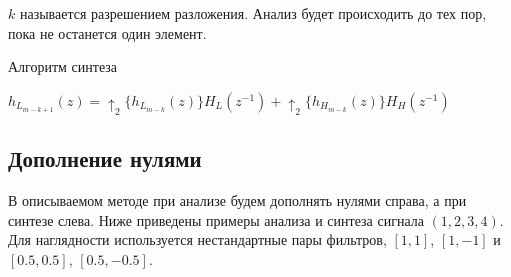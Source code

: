 \documentclass[oneside, final, 14pt]{article}
\begin{document}
$k$ называется разрешением разложения. Анализ будет происходить до тех пор, пока не останется один элемент.
\begin{algorithm}[H]
\caption{Алгоритм синтеза}
\begin{algorithmic}
		\State$h_{L_{m-k + 1}}(z) = \uparrow_2 \{ h_{L_{m-k}}(z) \} H_L(z^{-1}) + \uparrow_2 \{ h_{H_{m-k}}(z) \} H_H(z^{-1})$
	\EndFor
\end{algorithmic}
\end{algorithm}	

\subsection{Дополнение нулями}
В описываемом методе при анализе будем дополнять нулями справа, а при синтезе слева. Ниже приведены примеры анализа и синтеза сигнала $(1,2,3,4)$. Для наглядности используется нестандартные пары фильтров, $[1,1]$, $[1,-1]$ и $[0.5,0.5]$, $[0.5,-0.5]$.
\begin{center}
\end{center}
\end{document}
